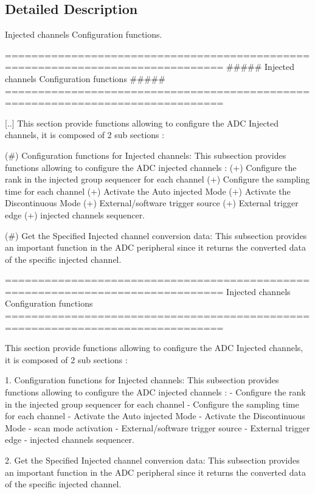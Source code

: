 \subsection{Detailed Description}
Injected channels Configuration functions. \begin{DoxyVerb} ===============================================================================
                     ##### Injected channels Configuration functions #####
 ===============================================================================  

  [..] This section provide functions allowing to configure the ADC Injected channels,
  it is composed of 2 sub sections : 
    
  (#) Configuration functions for Injected channels: This subsection provides 
     functions allowing to configure the ADC injected channels :    
    (+) Configure the rank in the injected group sequencer for each channel
    (+) Configure the sampling time for each channel    
    (+) Activate the Auto injected Mode  
    (+) Activate the Discontinuous Mode  
    (+) External/software trigger source   
    (+) External trigger edge 
    (+) injected channels sequencer.
    
   (#) Get the Specified Injected channel conversion data: This subsection 
      provides an important function in the ADC peripheral since it returns the 
      converted data of the specific injected channel.\end{DoxyVerb}


\begin{DoxyVerb} ===============================================================================
                     Injected channels Configuration functions
 ===============================================================================  

  This section provide functions allowing to configure the ADC Injected channels,
  it is composed of 2 sub sections : 
    
  1. Configuration functions for Injected channels: This subsection provides 
     functions allowing to configure the ADC injected channels :    
    - Configure the rank in the injected group sequencer for each channel
    - Configure the sampling time for each channel    
    - Activate the Auto injected Mode  
    - Activate the Discontinuous Mode 
    - scan mode activation  
    - External/software trigger source   
    - External trigger edge 
    - injected channels sequencer.
    
   2. Get the Specified Injected channel conversion data: This subsection 
      provides an important function in the ADC peripheral since it returns the 
      converted data of the specific injected channel.\end{DoxyVerb}
 

